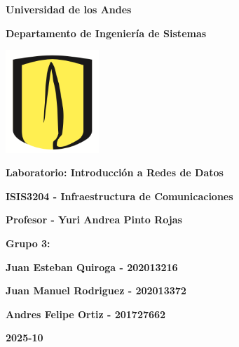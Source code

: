 \documentclass[10pt]{article}
\title{ }
\begin{document}
\begingroup
\let\clearpage\relax %
\thispagestyle{empty}
\begin{center}
{\huge \bfseries Universidad de los Andes}

\vspace{25pt}
{\LARGE \bfseries Departamento de Ingeniería de Sistemas}

\vspace{15pt}
\includegraphics[width=100pt]{images/logo.png} 

\vspace{35pt}
{\LARGE \bfseries Laboratorio: Introducción a Redes de Datos}
\vspace{55pt}

{\Large \bfseries ISIS3204 - Infraestructura de Comunicaciones}

\vspace{15pt}
{\Large \bfseries Profesor - Yuri Andrea Pinto Rojas}

\vspace{100pt}
{\Large \bfseries Grupo 3: }

\end{center}

\begin{flushleft}
  \setlength{\parskip}{0pt}
  \setlength{\itemsep}{0pt}
  \hspace*{4cm}\large\bfseries Juan Esteban Quiroga - 202013216

  \hspace*{4cm}\large\bfseries Juan Manuel Rodriguez - 202013372

  \hspace*{4cm}\large\bfseries Andres Felipe Ortiz - 201727662
\end{flushleft}

\begin{center}
\vspace{60pt}

\Large\bfseries 2025-10
\end{center}

\mbox{}
\endgroup

\clearpage

\tableofcontents
\clearpage
\end{document}
